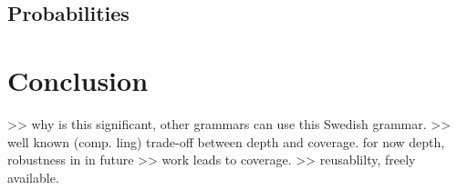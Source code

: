 \documentclass{report}
\begin{document}
\subsection{Probabilities}
\label{sec:futureProbabilities}


\section{Conclusion}
>> why is this significant, other grammars can use this Swedish grammar.
>> well known (comp. ling) trade-off between depth and coverage. for now depth, robustness in in future
>> work leads to coverage.
>> reusablilty, freely available.




\end{document}

